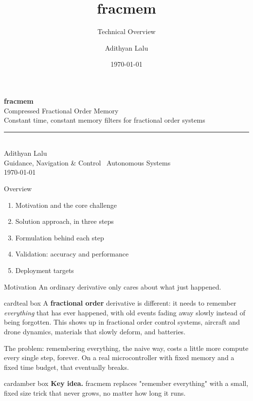 \documentclass[10pt,aspectratio=169]{beamer}
\title{\textbf{fracmem}}
\subtitle{Technical Overview}
\author{Adithyan Lalu}
\institute{Guidance, Navigation \& Control \textbar\ Autonomous Systems}
\date{\today}
\newcommand{\ideacard}[1]{%
  \begin{beamercolorbox}[wd=\linewidth,sep=0.9em,rounded=true]{cardamber box}
  {\color{amberAccent}\textbf{Key idea.}} #1
  \end{beamercolorbox}}
\newcommand{\saycard}[1]{%
  \begin{beamercolorbox}[wd=\linewidth,sep=0.9em,rounded=true]{cardteal box}
  #1
  \end{beamercolorbox}}
\begin{document}
{
\begin{frame}[plain]
  \vspace{1.1cm}
  \begin{center}
    {\Huge\bfseries\color{inkNavy} fracmem}\\[0.6em]
    {\large\color{slate} Compressed Fractional Order Memory}\\[0.3em]
    {\footnotesize\color{slate} Constant time, constant memory filters for fractional order systems}\\[1.6em]
    {\color{amberAccent}\rule{0.5\linewidth}{1.4pt}}\\[1.6em]
    {\large Adithyan Lalu}\\[0.25em]
    {\small\color{slate} Guidance, Navigation \& Control \textbar\ Autonomous Systems}\\[0.3em]
    {\small\color{slate} \today}
  \end{center}
\end{frame}
}

\begin{frame}{Overview}
  \begin{enumerate}
    \setlength\itemsep{0.85em}
    \item Motivation and the core challenge
    \item Solution approach, in three steps
    \item Formulation behind each step
    \item Validation: accuracy and performance
    \item Deployment targets
  \end{enumerate}
\end{frame}

\begin{frame}{Motivation}
  An ordinary derivative only cares about what just happened.

  \vspace{0.3em}
  \saycard{A \textbf{fractional order} derivative is different: it needs to remember \emph{everything} that has ever happened, with old events fading away slowly instead of being forgotten. This shows up in fractional order control systems, aircraft and drone dynamics, materials that slowly deform, and batteries.}

  \vspace{0.4em}
  The problem: remembering everything, the naive way, costs a little more compute every single step, forever. On a real microcontroller with fixed memory and a fixed time budget, that eventually breaks.

  \vspace{0.3em}
  \ideacard{fracmem replaces "remember everything" with a small, fixed size trick that never grows, no matter how long it runs.}
\end{frame}
\end{document}
